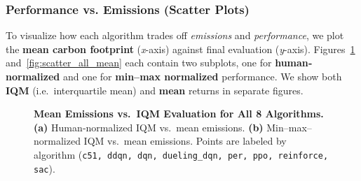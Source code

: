 \subsubsection{Performance vs. Emissions (Scatter Plots)}
To visualize how each algorithm trades off \emph{emissions} and \emph{performance},
we plot the \textbf{mean carbon footprint} (\textit{x}-axis) against final evaluation 
(\textit{y}-axis). Figures~\ref{fig:scatter_all_iqmean} and~\ref{fig:scatter_all_mean}
each contain two subplots, one for \textbf{human‐normalized} and one for 
\textbf{min--max normalized} performance. We show both \textbf{IQM} (i.e.\ interquartile mean) 
and \textbf{mean} returns in separate figures.

\begin{figure} 
	\centering
	\quad
	\caption{\textbf{Mean Emissions vs.\ IQM Evaluation for All 8 Algorithms.}
		\textbf{(a)} Human‐normalized IQM vs.\ mean emissions. 
		\textbf{(b)} Min--max–normalized IQM vs.\ mean emissions. 
		Points are labeled by algorithm (\texttt{c51, ddqn, dqn, dueling\_dqn, per, ppo, reinforce, sac}).}
	\label{fig:scatter_all_iqmean}
\end{figure}

